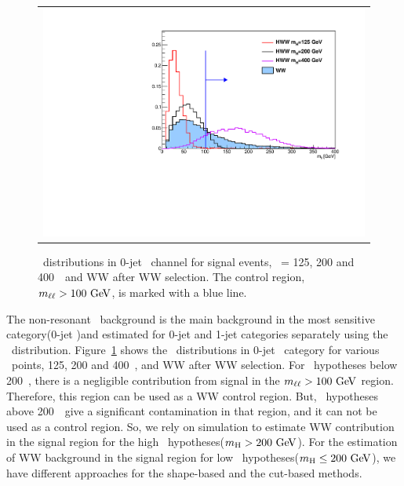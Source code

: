 \section{ \ww }
\begin{figure}[htp] 
\centering 
\begin{tabular}{c} 
\includegraphics[width=1.0\textwidth]{figures/WW_mll_0j_of.pdf} 
\end{tabular} 
\caption{ \mll\ distributions in 0-jet \DF\ channel for signal events, 
\mHi\ = 125, 200 and 400~\GeV\ and WW after WW selection. The control region, $m_{\ell\ell}>100~\mathrm{Ge\kern -0.1em V}$, 
is marked with a blue line.} 
\label{fig:WW_mll} 
\end{figure}  

The non-resonant \WW\ background is the main background in the most sensitive 
category(0-jet \DF)and estimated for 0-jet and 1-jet categories separately 
using the \mll\ distribution.
Figure~\ref{fig:WW_mll} shows the \mll\ distributions in 0-jet \DF\ 
category for various \mHi\ points, 125, 200 and 400~\GeV, and WW after WW selection. 
For \mHi\ hypotheses below 200~\GeV, 
there is a negligible contribution from signal in the $m_{\ell\ell}>100~\mathrm{Ge\kern -0.1em V}$ region. 
Therefore, this region can be used as a WW control region.  
But, \mHi\ hypotheses above 200~\GeV\ give a significant contamination in that region,
and it can not be used as a control region. So, we rely on simulation
to estimate WW contribution in the signal region for the high \mHi\ hypotheses($m_{\mathrm{H}}>200~\mathrm{Ge\kern -0.1em V}$). 
For the estimation of WW background in the signal region 
for low \mHi\ hypotheses($m_{\mathrm{H}}\le200~\mathrm{Ge\kern -0.1em V}$), 
we have different approaches for the shape-based and the cut-based methods. 

